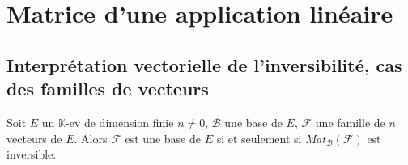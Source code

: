 \documentclass[../main.tex]{subfiles}
\begin{document}
\setcounter{chapter}{27}
\chapter{Matrice d'une application linéaire}
\tableofcontents
\clearpage

\section{Interprétation vectorielle de l'inversibilité, cas des familles de vecteurs}
\begin{tcolorbox}[title=Théorème 28.5, title filled=false, colframe=orange, colback=orange!10!white]
    Soit $E$ un $\mathbb{K}$-ev de dimension finie $n\neq 0$, $\mathcal{B}$ une base de $E$, $\mathcal{F}$ une famille de $n$ vecteurs de $E$. Alors $\mathcal{F}$ est une base de $E$ si et seulement si $Mat_{\mathcal{B}}(\mathcal{F})$ est inversible.
\end{tcolorbox}
\end{document}
